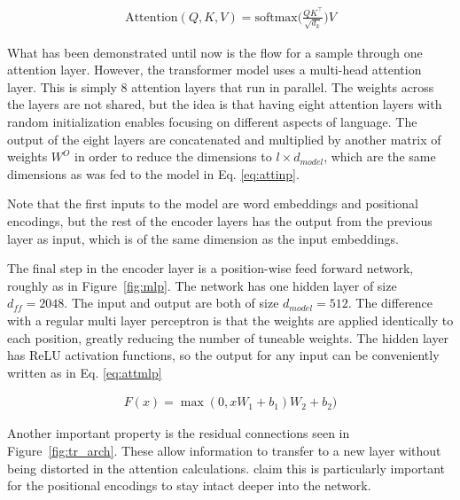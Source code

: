 \begin{align}
    \text{Attention}(Q,K,V) = \text{softmax}\Big( \frac{Q K^\intercal}{\sqrt{d_k}}\Big) V
    \label{eq:attout}
\end{align}

What has been demonstrated until now is the flow for a sample through one attention layer. However, the transformer model uses a multi-head attention layer. This is simply 8 attention layers that run in parallel. The weights across the layers are not shared, but the idea is that having eight attention layers with random initialization enables focusing on different aspects of language. The output of the eight layers are concatenated and multiplied by another matrix of weights $W^O$ in order to reduce the dimensions to $l \times d_{model}$, which are the same dimensions as was fed to the model in Eq. \ref{eq:attinp}. 

Note that the first inputs to the model are word embeddings and positional encodings, but the rest of the encoder layers has the output from the previous layer as input, which is of the same dimension as the input embeddings. 

The final step in the encoder layer is a position-wise feed forward network, roughly as in Figure~\ref{fig:mlp}. The network has one hidden layer of size $d_{ff} = 2048$. The input and output are both of size $d_{model} = 512$. The difference with a regular multi layer perceptron is that the weights are applied identically to each position, greatly reducing the number of tuneable weights. The hidden layer has ReLU activation functions, so the output for any input can be conveniently written as in Eq. \ref{eq:attmlp}

\begin{align}
    F(x) = \max(0, x W_1 + b_1)W_2 + b_2)\label{eq:attmlp}
\end{align}

Another important property is the residual connections seen in Figure~\ref{fig:tr_arch}. These allow information to transfer to a new layer without being distorted in the attention calculations. \citet{NIPS2017_7181} claim this is particularly important for the positional encodings to stay intact deeper into the network. 

